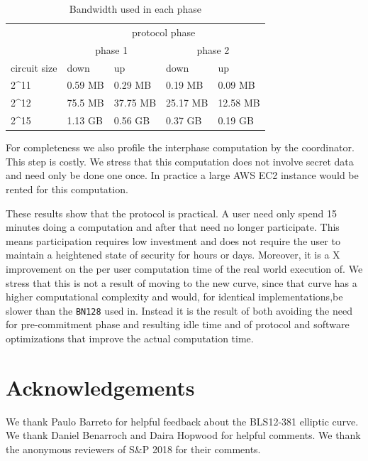 \documentclass{article}
\begin{document}
\begin{table}[h]
\centering
\caption{Bandwidth used in each phase}
\label{tab:bandwidth}
\begin{adjustbox}{width=\linewidth}
\centering
\begin{tabular}{l|l|l|l|l|}
\cline{2-5}
                                           & \multicolumn{4}{c|}{protocol phase}                         \\ \cline{2-5} 
                                           & \multicolumn{2}{c|}{phase 1} & \multicolumn{2}{c|}{phase 2} \\ \hline
\multicolumn{1}{|c|}{circuit size}         & down          & up           & down          & up           \\ \hline
\multicolumn{1}{|l|}{2\textasciicircum 11} & 0.59 MB        & 0.29  MB      & 0.19 MB        & 0.09 MB       \\ \hline
\multicolumn{1}{|l|}{2\textasciicircum 12} & 75.5 MB        & 37.75 MB       & 25.17 MB        & 12.58 MB        \\ \hline
\multicolumn{1}{|l|}{2\textasciicircum 15} & 1.13 GB        & 0.56 GB       & 0.37 GB        & 0.19 GB       \\ \hline
\end{tabular}
\end{adjustbox}
\end{table}


For completeness we also profile the interphase computation by the coordinator. This step is costly. We stress that this computation does not involve secret data and need only be done one once. In practice a large AWS EC2 instance would be rented for this computation.


These results show that the protocol is  practical. A user need only spend 15 minutes doing a computation and after that need no longer participate. This means participation requires low investment and does not require the user to maintain a heightened state of security for hours or days.  Moreover, it is a  X improvement on the per user computation time of the real world execution of\cite{BGG17}. We stress that this is not a result of moving to the new curve, since that curve has a higher computational complexity and would, for identical implementations,be slower than the \texttt{BN128} used in\cite{BGG17}. Instead it is the result of both avoiding the need for pre-commitment phase and resulting idle time and of protocol and software optimizations that improve the actual computation time.




 \section*{Acknowledgements}
 We thank Paulo Barreto for helpful feedback about the BLS12-381 elliptic curve. We thank Daniel Benarroch and Daira Hopwood for helpful comments. We thank the anonymous reviewers of S\&P 2018 for their comments.




\end{document}
